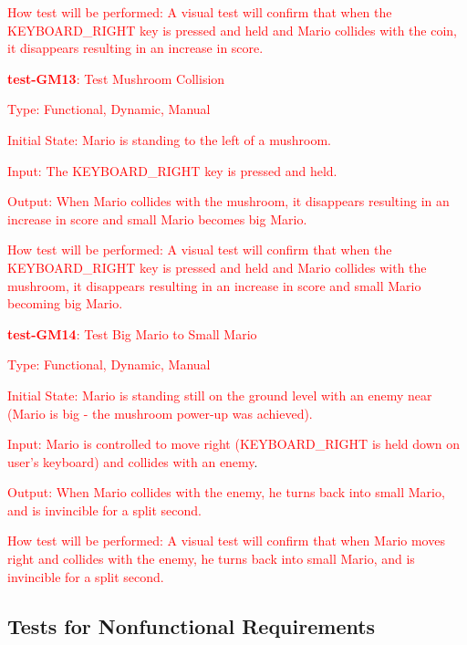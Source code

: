 \documentclass[12pt, titlepage]{article}
\begin{document}
\begin{enumerate}
\textcolor{red}{How test will be performed: A visual test will confirm that when the KEYBOARD\_RIGHT key is pressed and held and Mario collides with the coin, it disappears resulting in an increase in score.}

\textcolor{red}{\item{\textbf{test-GM13}: Test Mushroom Collision\\}}

\textcolor{red}{Type: Functional, Dynamic, Manual}

\textcolor{red}{Initial State: Mario is standing to the left of a mushroom.}

\textcolor{red}{Input: The KEYBOARD\_RIGHT key is pressed and held.}

\textcolor{red}{Output: When Mario collides with the mushroom, it disappears resulting in an increase in score and small Mario becomes big Mario.}

\textcolor{red}{How test will be performed: A visual test will confirm that when the KEYBOARD\_RIGHT key is pressed and held and Mario collides with the mushroom, it disappears resulting in an increase in score and small Mario becoming big Mario.}

\textcolor{red}{\item{\textbf{test-GM14}: Test Big Mario to Small Mario\\}}

\textcolor{red}{Type: Functional, Dynamic, Manual}

\textcolor{red}{Initial State: Mario is standing still on the ground level with an enemy near (Mario is big - the mushroom power-up was achieved).}

\textcolor{red}{Input: Mario is controlled to move right (KEYBOARD\_RIGHT is held down on user's keyboard) and collides with an enemy}.

\textcolor{red}{Output: When Mario collides with the enemy, he turns back into small Mario, and is invincible for a split second.}

\textcolor{red}{How test will be performed: A visual test will confirm that when Mario moves right and collides with the enemy, he turns back into small Mario, and is invincible for a split second.}

\end{enumerate}

\subsection{Tests for Nonfunctional Requirements}
\end{document}
